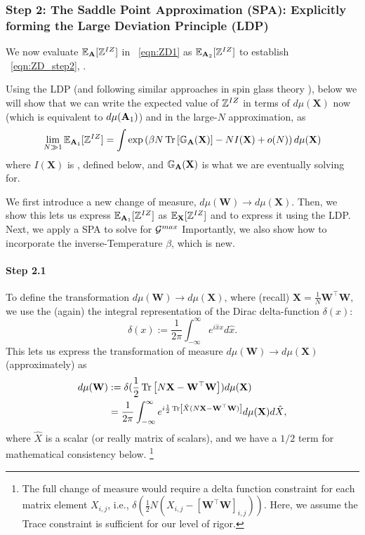\subsubsection{Step 2: The Saddle Point Approximation (SPA): Explicitly forming the Large Deviation Principle (LDP)}
\label{sxn:tanaka_step2}
We now evaluate $\mathbb{E}_{\mathbf{A}}[\mathbb{Z}^{IZ}]$ in \EQN~\ref{eqn:ZD1} as $\mathbb{E}_{\mathbf{A}_2}[\mathbb{Z}^{IZ}]$ 
to  establish \EQN~\ref{eqn:ZD_step2}, .

Using the LDP (and following similar approaches in spin glass theory \cite{PP95}),
below we will show that we can write the expected value of $\mathbb{Z}^{IZ}$ 
in terms of $d\mu(\mathbf{X})$ now (which is equivalent to $d\mu(\mathbf{A}_{1})$)
and in the large-$N$ approximation, as
\begin{equation}
  \label{eqn:LDP}
 \lim_{N \gg 1} \mathbb{E}_{\mathbf{A}_1}[\mathbb{Z}^{IZ}]=
  \int\exp\left(\beta N \mbox{}\operatorname{Tr}\left[\mathbb{G}_{\mathbf{A}}(\mathbf{X})\right]-NI(\mathbf{X})+o(N)\right)d\mu(\mathbf{X})
\end{equation}
where $I(\mathbf{X})$ is  \RateFunction, defined below,
and  $\mathbb{G}_{\mathbf{A}}(\mathbf{X})$ is what we are eventually solving for.

We first introduce a new change of measure, 
 $d\mu(\mathbf{W})\rightarrow d\mu(\mathbf{X})$.
Then, we show this lets us express $\mathbb{E}_{\mathbf{A}_1}[\mathbb{Z}^{IZ}]$ as $\mathbb{E}_{\mathbf{X}}[\mathbb{Z}^{IZ}]$ and to express it using the LDP.
Next, we apply a SPA to solve for $\mathcal{G}^{max}$
Importantly, we also show how to incorporate the inverse-Temperature $\beta$,
which is new.
\\

\paragraph{Step 2.1}
To define the transformation $d\mu(\mathbf{W})\rightarrow d\mu(\mathbf{X})$,  where (recall) $\mathbf{X}=\frac{1}{N}\mathbf{W}^{\top}\mathbf{W}$,
we use the (again) the integral representation of the Dirac delta-function $\delta(x)$:
\begin{equation}
  \label{eqn:dirac}
  \delta(x):=\frac{1}{2\pi}\int_{-\infty}^{\infty} e^{i\hat{x}x} d\hat{x}.
\end{equation}
%
This lets us express the transformation of measure $d\mu(\mathbf{W})\rightarrow d\mu(\mathbf{X})$
(approximately) as
\begin{align}
\nonumber
  d\mu(\mathbf{W}) &:= \delta(\frac{1}{2}\mbox{}\operatorname{Tr}\left[N\mathbf{X}-\mathbf{W}^{\top}\mathbf{W}\right]) d\mu(\mathbf{X}) \\ 
  &= \frac{1}{2\pi}\int_{-\infty}^{\infty} e^{i\frac{1}{2}
    \mbox{}\operatorname{Tr}\left[\hat{X}(N\mathbf{X}-\mathbf{W}^{\top}\mathbf{W})\right]
  }
  d\mu(\mathbf{X})d\hat{X}  ,
\end{align}
where $\hat{X}$ is a scalar (or really matrix of scalars),
and we have a $1/2$ term for mathematical consistency below.
\footnote{The full change of measure would require a delta function constraint
for each matrix element $X_{i,j}$, i.e., 
$\delta\left(\frac{1}{2}N\left(X_{i,j}-[\mathbf{W}^{\top}\mathbf{W}]_{i,j}\right)\right)$.
Here, we assume the Trace constraint is sufficient for our level of rigor.
}



